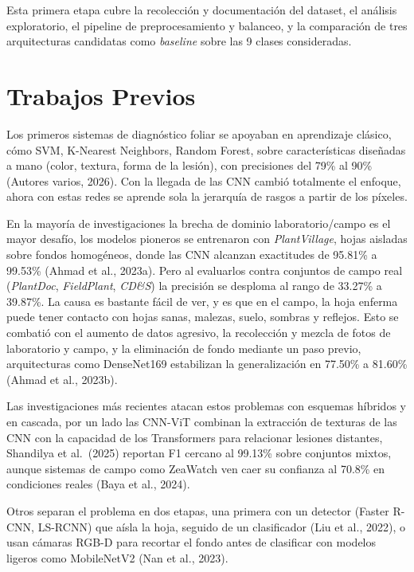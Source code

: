 \documentclass[12pt,letterpaper]{article}
\begin{document}
Esta primera etapa cubre la recolecci\'on y documentaci\'on del dataset, el an\'alisis exploratorio, el pipeline de preprocesamiento y balanceo, y la comparaci\'on de tres arquitecturas candidatas como \textit{baseline} sobre las 9 clases consideradas.

\section{Trabajos Previos}

Los primeros sistemas de diagn\'ostico foliar se apoyaban en aprendizaje cl\'asico, cómo SVM, K-Nearest Neighbors, Random Forest, sobre caracter\'isticas dise\~nadas a mano (color, textura, forma de la lesi\'on), con precisiones del 79\% al 90\% (Autores varios, 2026). Con la llegada de las CNN cambió totalmente el enfoque, ahora con estas redes se aprende sola la jerarqu\'ia de rasgos a partir de los p\'ixeles.

En la mayoría de investigaciones la brecha de dominio laboratorio/campo es el mayor desafío, los modelos pioneros se entrenaron con \textit{PlantVillage}, hojas aisladas sobre fondos homog\'eneos, donde las CNN alcanzan exactitudes de 95.81\% a 99.53\% (Ahmad et al., 2023a). Pero al evaluarlos contra conjuntos de campo real (\textit{PlantDoc}, \textit{FieldPlant}, \textit{CD\&S}) la precisi\'on se desploma al rango de 33.27\% a 39.87\%. La causa es bastante fácil de ver, y es que en el campo, la hoja enferma puede tener contacto con hojas sanas, malezas, suelo, sombras y reflejos. Esto se combatió con el aumento de datos agresivo, la recolección y mezcla de fotos de laboratorio y campo, y la eliminaci\'on de fondo mediante un paso previo, arquitecturas como DenseNet169 estabilizan la generalizaci\'on en 77.50\% a 81.60\% (Ahmad et al., 2023b).

Las investigaciones más recientes atacan estos problemas con esquemas h\'ibridos y en cascada, por un lado las CNN-ViT combinan la extracci\'on de texturas de las CNN con la capacidad de los Transformers para relacionar lesiones distantes, Shandilya et al.\ (2025) reportan F1 cercano al 99.13\% sobre conjuntos mixtos, aunque sistemas de campo como ZeaWatch ven caer su confianza al 70.8\% en condiciones reales (Baya et al., 2024).

Otros separan el problema en dos etapas, una primera con un detector (Faster R-CNN, LS-RCNN) que a\'isla la hoja, seguido de un clasificador (Liu et al., 2022), o usan c\'amaras RGB-D para recortar el fondo antes de clasificar con modelos ligeros como MobileNetV2 (Nan et al., 2023).
\end{document}
